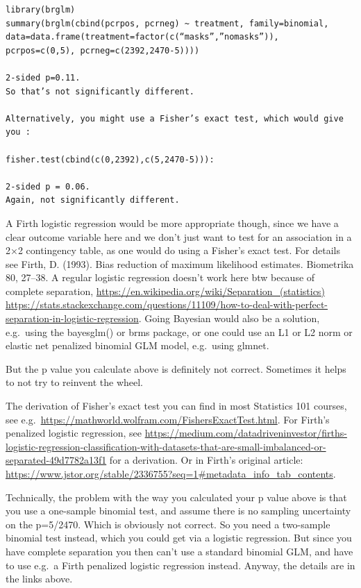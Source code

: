 \documentclass[
]{book}
\begin{document}
\begin{verbatim}
library(brglm)
summary(brglm(cbind(pcrpos, pcrneg) ~ treatment, family=binomial, data=data.frame(treatment=factor(c(“masks”,”nomasks”)),
pcrpos=c(0,5), pcrneg=c(2392,2470-5))))

2-sided p=0.11.
So that’s not significantly different.

Alternatively, you might use a Fisher’s exact test, which would give you :

fisher.test(cbind(c(0,2392),c(5,2470-5))):

2-sided p = 0.06.
Again, not significantly different.
\end{verbatim}

A Firth logistic regression would be more appropriate though, since we have a clear outcome variable here and we don't just want to test for an association in a 2×2 contingency table, as one would do using a Fisher's exact test. For details see Firth, D. (1993). Bias reduction of maximum likelihood estimates. Biometrika 80, 27--38. A regular logistic regression doesn't work here btw because of complete separation, \url{https://en.wikipedia.org/wiki/Separation_(statistics)} \url{https://stats.stackexchange.com/questions/11109/how-to-deal-with-perfect-separation-in-logistic-regression}. Going Bayesian would also be a solution, e.g.~using the bayesglm() or brms package, or one could use an L1 or L2 norm or elastic net penalized binomial GLM model, e.g.~using glmnet.

But the p value you calculate above is definitely not correct. Sometimes it helps to not try to reinvent the wheel.

The derivation of Fisher's exact test you can find in most Statistics 101 courses, see e.g.~\url{https://mathworld.wolfram.com/FishersExactTest.html}. For Firth's penalized logistic regression, see \url{https://medium.com/datadriveninvestor/firths-logistic-regression-classification-with-datasets-that-are-small-imbalanced-or-separated-49d7782a13f1} for a derivation. Or in Firth's original article: \url{https://www.jstor.org/stable/2336755?seq=1\#metadata_info_tab_contents}.

Technically, the problem with the way you calculated your p value above is that you use a one-sample binomial test, and assume there is no sampling uncertainty on the p=5/2470. Which is obviously not correct. So you need a two-sample binomial test instead, which you could get via a logistic regression. But since you have complete separation you then can't use a standard binomial GLM, and have to use e.g.~a Firth penalized logistic regression instead. Anyway, the details are in the links above.
\end{document}
